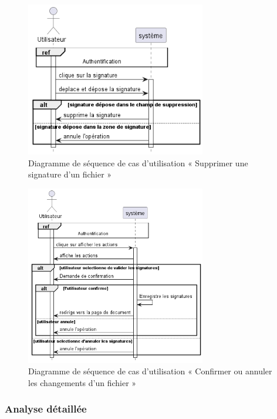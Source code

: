 \begin{figure}[H]
  \centering
  \includegraphics[width=0.7\textwidth]{out/diagrams/sprint4/delete_signature/delete_signature}
  \caption{Diagramme de séquence de cas d'utilisation « Supprimer une signature d’un fichier »}
  \label{fig:sequence_move_signature}
\end{figure}
\begin{figure}[H]
  \centering
  \includegraphics[width=0.7\textwidth]{out/diagrams/sprint4/save_cancel_siganture/save_cancel_siganture}
  \caption{Diagramme de séquence de cas d'utilisation « Confirmer ou annuler les changements d’un fichier »}
  \label{fig:sequence_save_cancel_siganture}
\end{figure}



\subsubsection{Analyse détaillée}

